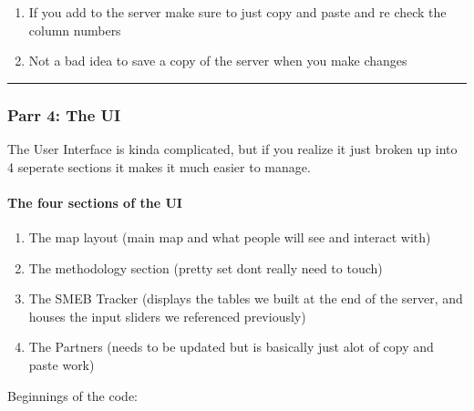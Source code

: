\documentclass[
]{article}
\providecommand{\tightlist}{%
  \setlength{\itemsep}{0pt}\setlength{\parskip}{0pt}}
\begin{document}
\begin{enumerate}
\def\labelenumi{\arabic{enumi}.}
\setcounter{enumi}{1}
\tightlist
\item
  If you add to the server make sure to just copy and paste and re check
  the column numbers
\item
  Not a bad idea to save a copy of the server when you make changes
\end{enumerate}

\begin{center}\rule{0.5\linewidth}{0.5pt}\end{center}

\hypertarget{parr-4-the-ui}{%
\subsubsection{Parr 4: The UI}\label{parr-4-the-ui}}

The User Interface is kinda complicated, but if you realize it just
broken up into 4 seperate sections it makes it much easier to manage.

\hypertarget{the-four-sections-of-the-ui}{%
\paragraph{The four sections of the
UI}\label{the-four-sections-of-the-ui}}

\begin{enumerate}
\def\labelenumi{\arabic{enumi}.}
\tightlist
\item
  The map layout (main map and what people will see and interact with)
\item
  The methodology section (pretty set dont really need to touch)
\item
  The SMEB Tracker (displays the tables we built at the end of the
  server, and houses the input sliders we referenced previously)
\item
  The Partners (needs to be updated but is basically just alot of copy
  and paste work)
\end{enumerate}

Beginnings of the code:
\end{document}

